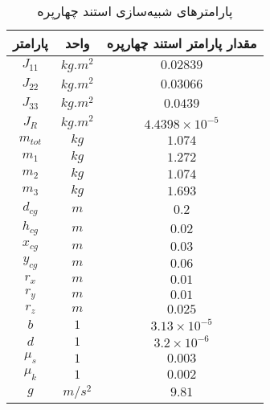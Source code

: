\begin{table}[H]
	\caption {پارامترهای شبیه‌سازی استند چهارپره \cite{norian}} 
	\label{parameterstable}
	\begin{center}
		\begin{tabular}{ c c c }
			\hline
	پارامتر & واحد & مقدار پارامتر استند چهارپره    \\
			\hline

			$J_{11}$ & $kg.m^2$& $0.02839$    \\
			$J_{22}$ & $kg.m^2$& $0.03066$   \\
			$J_{33}$ & $kg.m^2$&$0.0439$    \\
			$J_{R}$   & $kg.m^2$&$4.4398\times 10^{-5}$\\
			$m_{tot}$ & $kg$& $1.074$    \\
			$m_{1}$ & $kg$& $1.272$    \\
			$m_{2}$ & $kg$& $1.074$    \\
			$m_{3}$ & $kg$& $1.693$    \\
			$d_{cg}$ & $m$ &$0.2$     \\
			$h_{cg}$ & $m$  &$0.02$   \\
			$x_{cg}$ & $m$  &$0.03$   \\
			$y_{cg}$ & $m$  &$0.06$   \\
			$r_{x}$ & $m$& $0.01$    \\
			$r_{y}$ & $m$& $0.01$    \\
			$r_{z}$ & $m$& $0.025$    \\
			$b$ &  $1$ &$3.13\times10^{-5}$   \\
			$d$ & $1$&$3.2\times10^{-6}$   \\
			$\mu_{s}$ & $1$& $0.003$    \\
			$\mu_{k}$ & $1$& $0.002$    \\
			$g$&$m/s^2$&$9.81$\\
			\hline
		\end{tabular}
	\end{center}
\end{table}



